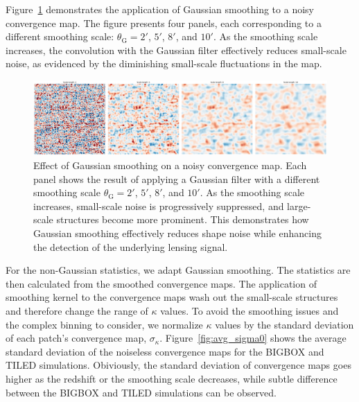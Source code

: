 Figure~\ref{fig:smoothing} demonstrates the application of Gaussian smoothing to a noisy convergence map. The figure presents four panels, each corresponding to a different smoothing scale: $\theta_{\mathrm{G}} = 2'$, $5'$, $8'$, and $10'$. As the smoothing scale increases, the convolution with the Gaussian filter effectively reduces small-scale noise, as evidenced by the diminishing small-scale fluctuations in the map. 
\begin{figure}[ht]
    \centering
    \includegraphics[width=\textwidth]{figures/smoothed_comparison.png}
    \caption{Effect of Gaussian smoothing on a noisy convergence map. Each panel shows the result of applying a Gaussian filter with a different smoothing scale $\theta_{\mathrm{G}} = 2'$, $5'$, $8'$, and $10'$. As the smoothing scale increases, small-scale noise is progressively suppressed, and large-scale structures become more prominent. This demonstrates how Gaussian smoothing effectively reduces shape noise while enhancing the detection of the underlying lensing signal.}
\label{fig:smoothing}
\end{figure}

For the non-Gaussian statistics, we adapt Gaussian smoothing. The statistics are then calculated from the smoothed convergence maps. The application of smoothing kernel to the convergence maps wash out the small-scale structures and therefore change the range of $\kappa$ values. To avoid the smoothing issues and the complex binning to consider, we normalize $\kappa$ values by the standard deviation of each patch's convergence map, $\sigma_{\kappa}$. Figure~\ref{fig:avg_sigma0} shows the average standard deviation of the noiseless convergence maps for the BIGBOX and TILED simulations. Obiviously, the standard deviation of convergence maps goes higher as the redshift or the smoothing scale decreases, while subtle difference between the BIGBOX and TILED simulations can be observed.

